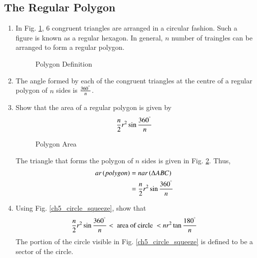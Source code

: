 \subsection{The Regular Polygon}
%
%
\renewcommand{\theequation}{\theenumi}
\begin{enumerate}[label=\arabic*.,ref=\thesubsection.\theenumi]
%

\item
	In Fig. \ref{ch5_polygon_def}, 6 congruent triangles are arranged in a circular fashion.  Such a figure is known as a regular hexagon.  In general, $n$ number of traingles can be arranged to form a regular polygon.
\begin{figure}[!ht]
	\begin{center}
		
		\resizebox{\columnwidth}{!}{}
	\end{center}
	\caption{Polygon Definition}
	\label{ch5_polygon_def}	
\end{figure}
%
\item
The angle formed by each of the congruent triangles at the centre of a regular polygon of $n$ sides is $\frac{360^{\degree}}{n}$.

%
\item
Show that the area of a regular polygon is given by 
%
\begin{equation}
\frac{n}{2}r^{2}\sin\frac{360^{\degree}}{n}
\end{equation}
%

\begin{figure}[!ht]
	\begin{center}
		
		\resizebox{\columnwidth}{!}{}
	\end{center}
	\caption{Polygon Area}
	\label{ch5_polygon_area}	
\end{figure}
%

\solution The triangle that forms the polygon of $n$ sides is given in Fig. \ref{ch5_polygon_area}.  Thus,
%
\begin{equation}
\begin{split}
ar\left(polygon\right) &= n ar\left(\Delta ABC\right) \\
&= \frac{n}{2}r^{2}\sin\frac{360^{\degree}}{n}
\end{split}
\end{equation}
%
\item
	Using Fig. \ref{ch5_circle_squeeze}, show that
%
\begin{equation}
\label{ch5_circle_squeeze_eq}
\frac{n}{2}r^{2}\sin\frac{360^{\degree}}{n} < \text{ area of circle } < nr^{2}\tan\frac{180^{\degree}}{n}
\end{equation}
%
The portion of the circle visible in Fig. \ref{ch5_circle_squeeze} is defined to be a sector of the circle.


\end{enumerate}
